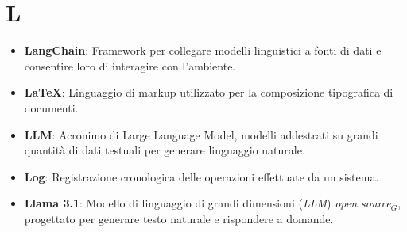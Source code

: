 \section{L}
\begin{itemize}
    \item \textbf{LangChain}: Framework per collegare modelli linguistici a fonti di dati e consentire loro di interagire con l'ambiente.
    \item \textbf{LaTeX}: Linguaggio di markup utilizzato per la composizione tipografica di documenti.
    \item \textbf{LLM}: Acronimo di Large Language Model, modelli addestrati su grandi quantità di dati testuali per generare linguaggio naturale.
    \item \textbf{Log}: Registrazione cronologica delle operazioni effettuate da un sistema.
    \item \textbf{Llama 3.1}: Modello di linguaggio di grandi dimensioni (\textit{LLM}) \textit{open source}$_G$, progettato per generare testo naturale e rispondere a domande.
\end{itemize}
